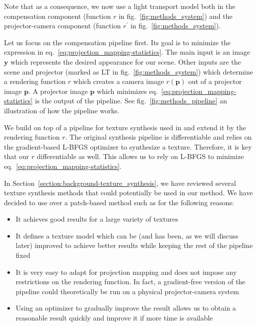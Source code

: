 Note that as a consequence, we now use a light transport model both in the compensation component (function \(r\) in fig.~\ref{fig:methods_system}) and the projector-camera component (function \(r^\prime\) in fig.~\ref{fig:methods_system}).

Let us focus on the compensation pipeline first. Its goal is to minimize the expression in eq.~\ref{eq:projection_mapping-statistics}. The main input is an image \(\bm{y}\) which represents the desired appearance for our scene. Other inputs are the scene and projector (marked as LT in fig.~\ref{fig:methods_system}) which determine a rendering function \(r\) which creates a camera image \(r(\bm{p})\) out of a projector image \(\bm{p}\). A projector image \(\bm{p}\) which minimizes eq.~\ref{eq:projection_mapping-statistics} is the output of the pipeline. See fig.~\ref{fig:methods_pipeline} an illustration of how the pipeline works.

We build on top of a pipeline for texture synthesis used in \citet{Gatys2015} and extend it by the rendering function \(r\). The original synthesis pipeline is differentiable and relies on the gradient-based L-BFGS optimizer to synthesize a texture. Therefore, it is key that our \(r\) differentiable as well. This allows us to rely on L-BFGS to minimize eq.~\ref{eq:projection_mapping-statistics}.

In Section~\ref{section:background-texture_synthesis}, we have reviewed several texture synthesis methods that could potentially be used in our method. We have decided to use \citet{Gatys2015} over a patch-based method such as \citet{Efros2001} for the following reasons:

\begin{itemize}
    \item It achieves good results for a large variety of textures
    \item It defines a texture model which can be (and has been, as we will discuss later) improved to achieve better results while keeping the rest of the pipeline fixed
    \item It is very easy to adapt for projection mapping and does not impose any restrictions on the rendering function. In fact, a gradient-free version of the pipeline could theoretically be run on a physical projector-camera system
    \item Using an optimizer to gradually improve the result allows us to obtain a reasonable result quickly and improve it if more time is available
\end{itemize}

